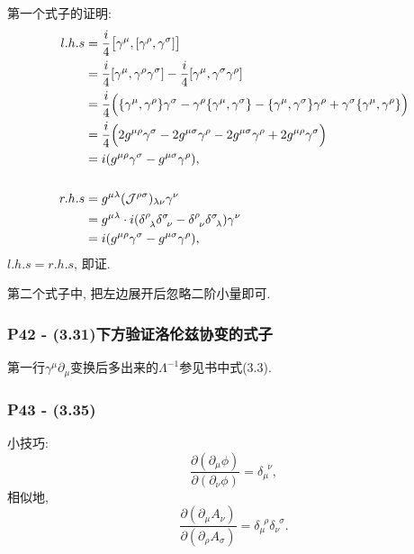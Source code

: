 \documentclass[cn,hazy,blue,11pt,device=normal,chinesefont=founder]{elegantnote}
\begin{document}
第一个式子的证明: 
\begin{equation}
  \begin{aligned}
    l.h.s &= \frac{i}{4}\bigl[\gamma^\mu, [\gamma^\rho, \gamma^\sigma]\bigr] \\
    &= \frac{i}{4}[\gamma^\mu, \gamma^\rho \gamma^\sigma] - \frac{i}{4}[\gamma^\mu, \gamma^\sigma \gamma^\rho] \\ 
    &= \frac{i}{4}\Bigl(\{\gamma^\mu, \gamma^\rho\}\gamma^\sigma - \gamma^\rho\{\gamma^\mu, \gamma^\sigma\} - \{\gamma^\mu, \gamma^\sigma\}\gamma^\rho + \gamma^\sigma\{\gamma^\mu, \gamma^\rho\}\Bigr) \\
    &= \frac{i}{4}\Bigl(2g^{\mu\rho}\gamma^\sigma - 2g^{\mu\sigma}\gamma^\rho - 2g^{\mu\sigma}\gamma^\rho + 2g^{\mu\rho}\gamma^\sigma \Bigr) \\
    &= i(g^{\mu\rho}\gamma^\sigma - g^{\mu\sigma}\gamma^\rho), \\
    \ \\
    r.h.s &= g^{\mu\lambda}(\mathcal{J}^{\rho\sigma})_{\lambda\nu} \gamma^\nu \\
    &= g^{\mu\lambda}\cdot i(\delta^\rho_{\phantom{1}\lambda} \delta^\sigma_{\phantom{1}\nu} - \delta^\rho_{\phantom{1}\nu} \delta^\sigma_{\phantom{1}\lambda}) \gamma^\nu \\ 
    &= i(g^{\mu\rho}\gamma^\sigma - g^{\mu\sigma}\gamma^\rho), 
  \end{aligned}
\end{equation}
$l.h.s = r.h.s$, 即证. 

第二个式子中, 把左边展开后忽略二阶小量即可. 

\subsubsection{P42 - (3.31)下方验证洛伦兹协变的式子}
第一行$\gamma^\mu \partial_\mu$变换后多出来的$\Lambda^{-1}$参见书中式(3.3).

\subsubsection{P43 - (3.35)}

小技巧: 
\begin{equation}
  \frac{\partial (\partial_\mu \phi)}{\partial (\partial_\nu \phi)} = \delta_\mu^{\phantom{1}\nu}, 
\end{equation}
相似地, 
\begin{equation}
  \frac{\partial (\partial_\mu A_\nu)}{\partial (\partial_\rho A_\sigma)} = \delta_\mu^{\phantom{1}\rho}\delta_\nu^{\phantom{1}\sigma}.
\end{equation}
\end{document}
